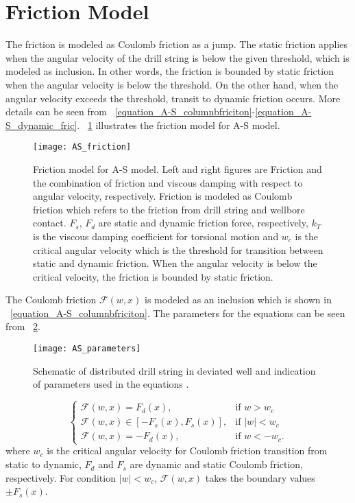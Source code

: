 \section{Friction Model}
The friction is modeled as Coulomb friction as a jump. The static friction applies when the angular velocity of the drill string is below the given threshold, which is modeled as inclusion. In other words, the friction is bounded by static friction when the angular velocity is below the threshold. On the other hand, when the angular velocity exceeds the threshold, transit to dynamic friction occurs. More details can be seen from \equationname~\ref{equation_A-S_columnbfriciton}-\ref{equation_A-S_dynamic_fric}. \figurename~\ref{figure_AS_friction} illustrates the friction model for A-S model.
\begin{figure}
  \centering
  \texttt{[image: AS\_friction]}
  \caption[Friction model for A-S model]{Friction model for A-S model. Left and right figures are Friction and the combination of friction and viscous damping with respect to angular velocity, respectively. Friction is modeled as Coulomb friction which refers to the friction from drill string and wellbore contact. $F_{s}$, $F_{d}$ are static and dynamic friction force, respectively, $k_{T}$ is the viscous damping coefficient for torsional motion and $w_{c}$ is the critical angular velocity which is the threshold for transition between static and dynamic friction. When the angular velocity is below the critical velocity, the friction is bounded by static friction.}\label{figure_AS_friction}
\end{figure}

The Coulomb friction $\mathcal{F}(w,x)$ is modeled as an inclusion which is shown in \equationname~\ref{equation_A-S_columnbfriciton}. The parameters for the equations can be seen from \figurename~\ref{figure_AS_equation_schematic}.
\begin{figure}
  \centering
  \texttt{[image: AS\_parameters]}
  \caption[Schematic of distributed drill string in deviated well]{Schematic of distributed drill string in deviated well and indication of parameters used in the equations \cite{ref:aarsnes2017a}.}\label{figure_AS_equation_schematic}
\end{figure}
\begin{equation}\label{equation_A-S_columnbfriciton}
  \begin{cases}
     \mathcal{F}(w,x) = F_{d}(x), & \mbox{if } w>w_c \\
     \mathcal{F}(w,x) \in [-F_{s}(x), F_{s}(x)], & \mbox{if } |w|<w_c \ \\
     \mathcal{F}(w,x) = -F_{d}(x), & \mbox{if } w < -w_c.
  \end{cases}
\end{equation}
where $w_c$ is the critical angular velocity for Coulomb friction transition from static to dynamic, $F_{d}$ and $F_{s}$ are dynamic and static Coulomb friction, respectively. For condition $|w|<w_c$, $\mathcal{F}(w,x)$ takes the boundary values $\pm F_{s}(x)$.

